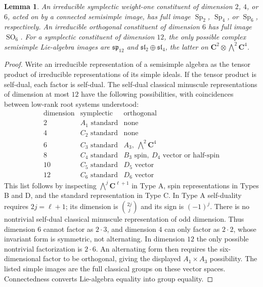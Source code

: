 \documentclass[10pt,reqno]{article}
\theoremstyle{emphasizedplain}
\theoremstyle{emphasizeddefinition}
\theoremstyle{emphasizeddefinition}
\newtheorem{prelemma}{Lemma}
\DeclareMathOperator{\Sp}{Sp}
\DeclareMathOperator{\SO}{SO}
\newcommand{\C}{\mathbf C}
\begin{document}
\begin{prelemma}\label{p:small}
An irreducible symplectic weight-one constituent of dimension $2$, $4$, or
$6$, acted on by a connected semisimple image, has full image $\Sp_2$,
$\Sp_4$, or $\Sp_6$, respectively. An irreducible orthogonal constituent of
dimension $6$ has full image $\SO_6$.
For a symplectic constituent of dimension $12$, the only possible
complex semisimple Lie-algebra images are $\mathfrak{sp}_{12}$ and
$\mathfrak{sl}_2\oplus\mathfrak{sl}_4$, the latter on
$\C^2\otimes\bigwedge^2\C^4$.
\end{prelemma}
\begin{proof}
Write an irreducible representation of a semisimple algebra as the tensor
product of irreducible representations of its simple ideals. If the tensor
product is self-dual, each factor is self-dual. The self-dual classical
minuscule representations of dimension at most $12$ have the following
possibilities, with coincidences between low-rank root systems understood:
\[
\begin{array}{c|c|c}
\text{dimension}&\text{symplectic}&\text{orthogonal}\\\hline
2& A_1\text{ standard}&\text{none}\\
4& C_2\text{ standard}&\text{none}\\
6& C_3\text{ standard}&A_3,\ \bigwedge^2\C^4\\
8& C_4\text{ standard}&B_3\text{ spin},\ D_4\text{ vector or half-spin}\\
10&C_5\text{ standard}&D_5\text{ vector}\\
12&C_6\text{ standard}&D_6\text{ vector}
\end{array}
\]
This list follows by inspecting $\bigwedge^j\C^{\ell+1}$ in Type A,
spin representations in Types B and D, and the standard representation in
Type C. In Type A self-duality requires $2j=\ell+1$; its dimension is
$\binom{2j}{j}$ and its sign is $(-1)^j$.
There is no nontrivial self-dual classical minuscule representation of odd
dimension. Thus dimension $6$ cannot factor as $2\cdot3$, and dimension $4$
can only factor as $2\cdot2$, whose invariant form is symmetric, not
alternating. In dimension $12$ the only possible nontrivial factorization is
$2\cdot6$. An alternating form then requires the six-dimensional factor to
be orthogonal, giving the displayed $A_1\times A_3$ possibility.
The listed simple images are the full classical groups on these vector
spaces. Connectedness converts Lie-algebra equality into group equality.
\end{proof}
\end{document}
